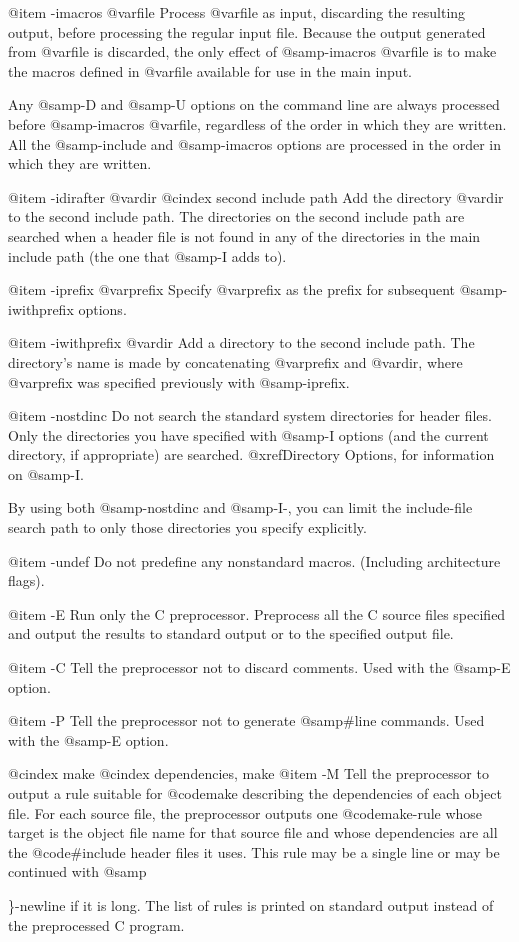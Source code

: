 {@item -imacros @var{file}
Process @var{file} as input, discarding the resulting output, before
processing the regular input file.  Because the output generated from
@var{file} is discarded, the only effect of @samp{-imacros @var{file}}
is to make the macros defined in @var{file} available for use in the
main input.

Any @samp{-D} and @samp{-U} options on the command line are always
processed before @samp{-imacros @var{file}}, regardless of the order in
which they are written.  All the @samp{-include} and @samp{-imacros}
options are processed in the order in which they are written.

@item -idirafter @var{dir}
@cindex second include path
Add the directory @var{dir} to the second include path.  The directories
on the second include path are searched when a header file is not found
in any of the directories in the main include path (the one that
@samp{-I} adds to).

@item -iprefix @var{prefix}
Specify @var{prefix} as the prefix for subsequent @samp{-iwithprefix}
options.

@item -iwithprefix @var{dir}
Add a directory to the second include path.  The directory's name is
made by concatenating @var{prefix} and @var{dir}, where @var{prefix}
was specified previously with @samp{-iprefix}.

@item -nostdinc
Do not search the standard system directories for header files.  Only
the directories you have specified with @samp{-I} options (and the
current directory, if appropriate) are searched.  @xref{Directory
Options}, for information on @samp{-I}.

By using both @samp{-nostdinc} and @samp{-I-}, you can limit the include-file
search path to only those directories you specify explicitly.

@item -undef
Do not predefine any nonstandard macros.  (Including architecture flags).

@item -E
Run only the C preprocessor.  Preprocess all the C source files
specified and output the results to standard output or to the
specified output file.

@item -C
Tell the preprocessor not to discard comments.  Used with the
@samp{-E} option.

@item -P
Tell the preprocessor not to generate @samp{#line} commands.
Used with the @samp{-E} option.

@cindex make
@cindex dependencies, make
@item -M
Tell the preprocessor to output a rule suitable for @code{make}
describing the dependencies of each object file.  For each source file,
the preprocessor outputs one @code{make}-rule whose target is the object
file name for that source file and whose dependencies are all the
@code{#include} header files it uses.  This rule may be a single line or
may be continued with @samp{\}-newline if it is long.  The list of rules
is printed on standard output instead of the preprocessed C program.

}}
